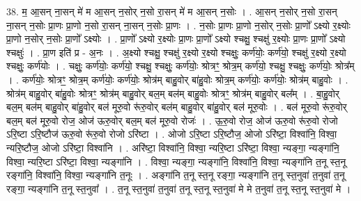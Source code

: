 \documentclass[17pt]{extarticle}
\begin{document}
38. म॒ आ॒सन् ना॒सन् मे॑ म आ॒सन् न॒सोर् न॒सो रा॒सन् मे॑ म आ॒सन् न॒सोः । . आ॒सन् न॒सोर् न॒सो रा॒सन् ना॒सन् न॒सोः प्रा॒णः प्रा॒णो न॒सो रा॒सन् ना॒सन् न॒सोः प्रा॒णः । . न॒सोः प्रा॒णः प्रा॒णो न॒सोर् न॒सोः प्रा॒णो᳚ ऽक्ष्यो र॒क्ष्योः प्रा॒णो न॒सोर् न॒सोः प्रा॒णो᳚ ऽक्ष्योः । . प्रा॒णो᳚ ऽक्ष्यो र॒क्ष्योः प्रा॒णः प्रा॒णो᳚ ऽक्ष्यो श्चक्षु॒ श्चक्षु॑ र॒क्ष्योः प्रा॒णः प्रा॒णो᳚ ऽक्ष्यो श्चक्षुः॑ । . प्रा॒ण इति॑ प्र - अ॒नः । . अ॒क्ष्यो श्चक्षु॒ श्चक्षु॑ र॒क्ष्यो र॒क्ष्यो श्चक्षुः॒ कर्ण॑योः॒ कर्ण॑यो॒ श्चक्षु॑ र॒क्ष्यो र॒क्ष्यो श्चक्षुः॒ कर्ण॑योः । . चक्षुः॒ कर्ण॑योः॒ कर्ण॑यो॒ श्चक्षु॒ श्चक्षुः॒ कर्ण॑योः॒ श्रोत्रꣳ॒॒ श्रोत्र॒म् कर्ण॑यो॒ श्चक्षु॒ श्चक्षुः॒ कर्ण॑योः॒ श्रोत्र᳚म् । . कर्ण॑योः॒ श्रोत्रꣳ॒॒ श्रोत्र॒म् कर्ण॑योः॒ कर्ण॑योः॒ श्रोत्र॑म् बाहु॒वोर् बा॑हु॒वोः श्रोत्र॒म् कर्ण॑योः॒ कर्ण॑योः॒ श्रोत्र॑म् बाहु॒वोः । . श्रोत्र॑म् बाहु॒वोर् बा॑हु॒वोः श्रोत्रꣳ॒॒ श्रोत्र॑म् बाहु॒वोर् बल॒म् बल॑म् बाहु॒वोः श्रोत्रꣳ॒॒ श्रोत्र॑म् बाहु॒वोर् बल᳚म् । . बा॒हु॒वोर् बल॒म् बल॑म् बाहु॒वोर् बा॑हु॒वोर् बल॑ मूरु॒वो रू॑रु॒वोर् बल॑म् बाहु॒वोर् बा॑हु॒वोर् बल॑ मूरु॒वोः । . बल॑ मूरु॒वो रू॑रु॒वोर् बल॒म् बल॑ मूरु॒वो रोज॒ ओज॑ ऊरु॒वोर् बल॒म् बल॑ मूरु॒वो रोजः॑ । . ऊ॒रु॒वो रोज॒ ओज॑ ऊरु॒वो रू॑रु॒वो रोजो ऽरि॒ष्टा ऽरि॒ष्टौज॑ ऊरु॒वो रू॑रु॒वो रोजो ऽरि॑ष्टा । . ओजो ऽरि॒ष्टा ऽरि॒ष्टौज॒ ओजो ऽरि॑ष्टा॒ विश्वा॑नि॒ विश्वा॒ न्यरि॒ष्टौज॒ ओजो ऽरि॑ष्टा॒ विश्वा॑नि । . अरि॑ष्टा॒ विश्वा॑नि॒ विश्वा॒ न्यरि॒ष्टा ऽरि॑ष्टा॒ विश्वा॒ न्यङ्गा॒ न्यङ्गा॑नि॒ विश्वा॒ न्यरि॒ष्टा ऽरि॑ष्टा॒ विश्वा॒ न्यङ्गा॑नि । . विश्वा॒ न्यङ्गा॒ न्यङ्गा॑नि॒ विश्वा॑नि॒ विश्वा॒ न्यङ्गा॑नि त॒नू स्त॒नू रङ्गा॑नि॒ विश्वा॑नि॒ विश्वा॒ न्यङ्गा॑नि त॒नूः । . अङ्गा॑नि त॒नू स्त॒नू रङ्गा॒ न्यङ्गा॑नि त॒नू स्त॒नुवा॑ त॒नुवा॑ त॒नू रङ्गा॒ न्यङ्गा॑नि त॒नू स्त॒नुवा᳚ । . त॒नू स्त॒नुवा॑ त॒नुवा॑ त॒नू स्त॒नू स्त॒नुवा॑ मे मे त॒नुवा॑ त॒नू स्त॒नू स्त॒नुवा॑ मे । \newline
\pagebreak
{}
\end{document}
